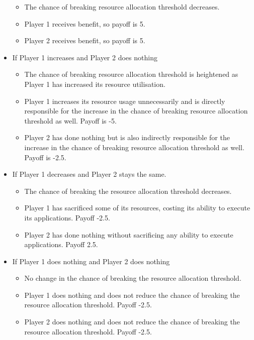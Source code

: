 \begin{itemize}
  \begin{itemize}
  \item
   The chance of breaking resource allocation threshold decreases.
  \item
    Player 1 receives benefit, so payoff is 5.
  \item
   Player 2 receives benefit, so payoff is 5.
  \end{itemize}
\item
 If Player 1 increases and Player 2 does nothing
  \begin{itemize}
  \item
    The chance of breaking resource allocation threshold is
    heightened as Player 1 has increased its resource utilisation.
  \item
    Player 1 increases its resource usage unnecessarily and is
    directly responsible for the increase in the chance of breaking
    resource allocation threshold as well. Payoff is -5.
  \item
   Player 2 has done nothing but is also indirectly responsible for
    the increase in the chance of breaking resource allocation threshold
    as well. Payoff is -2.5.
    \end{itemize}
  \item
  If Player 1 decreases and Player 2 stays the same.
    \begin{itemize}
    \item
    The chance of breaking the resource allocation threshold
      decreases.
    \item
     Player 1 has sacrificed some of its resources, costing its
      ability to execute its applications. Payoff -2.5.
    \item
    Player 2 has done nothing without sacrificing any ability to
      execute applications. Payoff 2.5.
    \end{itemize}
  \item
  If Player 1 does nothing and Player 2 does nothing
    \begin{itemize}
    \item
      No change in the chance of breaking the resource allocation
      threshold.
    \item
     Player 1 does nothing and does not reduce the chance of
      breaking the resource allocation threshold. Payoff -2.5.
    \item
      Player 2 does nothing and does not reduce the chance of
      breaking the resource allocation threshold. Payoff -2.5.
    \end{itemize}

\end{itemize}
